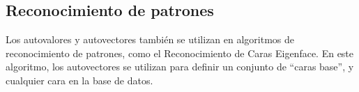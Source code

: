 \subsection{Reconocimiento de patrones} %
\label{sec:Reconocimiento de patrones}
Los autovalores y autovectores también se utilizan en algoritmos de reconocimiento de patrones, como el Reconocimiento de Caras Eigenface. En este algoritmo, los autovectores se utilizan para definir un conjunto de ``caras base'', y cualquier cara en la base de datos.



